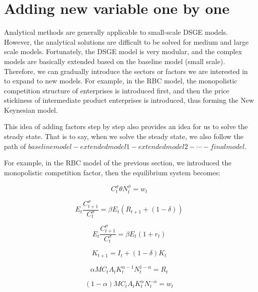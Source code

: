 \documentclass[10pt,math=newtx,citestyle=gb7714-2015,bibstyle=gb7714-2015]{elegantbook}
\begin{document}
	\section{Adding new variable one by one}
	
	Analytical methods are generally applicable to small-scale DSGE models.  However, the analytical solutions are difficult to be solved for medium and large scale models. Fortunately, the DSGE model is very modular, and the complex models are basically extended based on the baseline model (small scale). Therefore, we can gradually introduce the sectors or factors we are interested in to expand to new models. For example, in the RBC model, the monopolistic competition structure of enterprises is introduced first, and then the price stickiness of intermediate product enterprises is introduced, thus forming the New Keynesian model.

        This idea of adding factors step by step also provides an idea for us to solve the steady state. That is to say, when we solve the steady state, we also follow the path of $baseline model - extended model 1 - extended model 2 - \cdots - final model $.

        For example, in the RBC model of the previous section, we introduced the monopolistic competition factor, then the equilibrium system becomes:
	
	\begin{equation}\label{label}
		C_t^{\sigma}\theta N_t^{\phi}=w_t
	\end{equation}
	
	\begin{equation}\label{label}
		E_t\frac{C_{t+1}^{\sigma}}{C_t^{\sigma}}=\beta E_t(R_{t+1}+(1-\delta))
	\end{equation}
	
	\begin{equation}\label{label}
		E_t\frac{C_{t+1}^{\sigma}}{C_t^{\sigma}}=\beta E_t(1+r_t)
	\end{equation}
	
	\begin{equation}\label{label}
		K_{t+1}=I_t+(1-\delta)K_t
	\end{equation}
	
	\begin{equation}\label{label}
		\alpha MC_t A_tK_t^{\alpha-1}N_t^{1-\alpha}=R_t
	\end{equation}
	
	\begin{equation}\label{label}
		(1-\alpha)MC_t A_tK_t^{\alpha}N_t^{-\alpha}=w_t
	\end{equation}
	
\end{document}
